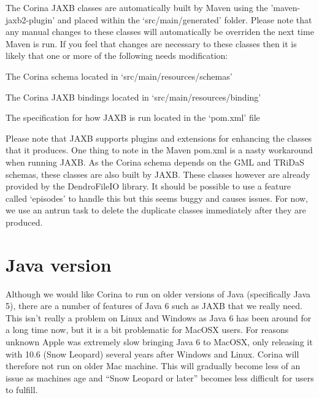 The Corina JAXB classes are automatically built by Maven using the 'maven-jaxb2-plugin' and placed within the `src/main/generated' folder.  Please note that any manual changes to these classes will automatically be overriden the next time Maven is run.  If you feel that changes are necessary to these classes then it is likely that one or more of the following needs modification:

\begin{itemize*}
 \item The Corina schema located in `src/main/resources/schemas'
 \item The Corina JAXB bindings located in `src/main/resources/binding'
 \item The specification for how JAXB is run located in the `pom.xml' file
\end{itemize*}

Please note that JAXB supports plugins and extensions for enhancing the classes that it produces.  One thing to note in the Maven pom.xml is a nasty workaround when running JAXB.  As the Corina schema depends on the GML and TRiDaS schemas, these classes are also built by JAXB.  These classes however are already provided by the DendroFileIO library.  It should be possible to use a feature called `episodes' to handle this but this seems buggy and causes issues.  For now, we use an antrun task to delete the duplicate classes immediately after they are produced.


\section{Java version}
\label{txt:java}
Although we would like Corina to run on older versions of Java (specifically Java 5), there are a number of features of Java 6 such as JAXB that we really need.  This isn't really a problem on Linux and Windows as Java 6 has been around for a long time now, but it is a bit problematic for MacOSX users.  For reasons unknown Apple was extremely slow bringing Java 6 to MacOSX, only releasing it with 10.6 (Snow Leopard) several years after Windows and Linux.  Corina will therefore not run on older Mac machine.  This will gradually become less of an issue as machines age and ``Snow Leopard or later'' becomes less difficult for users to fulfill.  

